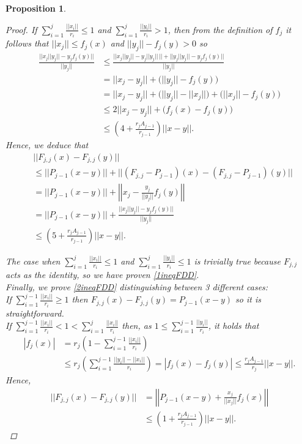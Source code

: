\documentclass[11pt]{amsart}
\newcommand{\<}{\langle}
\renewcommand{\>}{\rangle}
\newtheorem{prop}[theorem]{Proposition}
\theoremstyle{definition}
\theoremstyle{remark}
\numberwithin{equation}{section}
\begin{document}
\begin{prop}
\begin{proof}
If $\sum\limits_{i=1}^{j}\frac{||x_i||}{r_i}\le1$ and $\sum\limits_{i=1}^{j}\frac{||y_i||}{r_i}>1$, then from the definition of $f_j$ it follows that $||x_j||\le f_j(x)$ and $||y_j||-f_j(y)>0$ so
$$\begin{aligned}\frac{\big|\big|x_j||y_j||-y_jf_j(y)\big|\big|}{||y_j||}&\le\frac{\big|\big|x_j||y_j||-y_j||y_j||\,\big|\big|+\big|\big|y_j||y_j||-y_jf_j(y)\big|\big|}{||y_j||}\\
&=||x_j-y_j||+\big(||y_j||-f_j(y)\big)\\
&=||x_j-y_j||+\big(||y_j||-||x_j||\big)+\big(||x_j||-f_j(y)\big)\\
&\le2||x_j-y_j||+\big(f_j(x)-f_j(y)\big)\\
&\le\left(4+\frac{r_jA_{j-1}}{r_{j-1}}\right)||x-y||.
\end{aligned}$$
Hence, we deduce that
$$\begin{aligned} &||F_{j,j}(x)-F_{j,j}(y)||\\
&\le ||P_{j-1}(x-y)||+||(F_{j,j}-P_{j-1})(x)-(F_{j,j}-P_{j-1})(y)||\\
&=||P_{j-1}(x-y)||+\left|\left| x_j-\frac{y_j}{||y_j||}f_j(y) \right|\right|\\
&=||P_{j-1}(x-y)||+\frac{\big|\big|x_j||y_j||-y_jf_j(y) \big|\big|}{||y_j||}\\
&\le \left(5+\frac{r_jA_{j-1}}{r_{j-1}}\right)||x-y||. \end{aligned}$$

The case when  $\sum\limits_{i=1}^{j}\frac{||x_i||}{r_i}\le1$ and $\sum\limits_{i=1}^{j}\frac{||y_i||}{r_i}\le1$ is trivially true because $F_{j,j}$ acts as the identity, so we have proven \eqref{1ineqFDD}.\\

Finally, we prove \eqref{2ineqFDD} distinguishing between 3 different cases:\\

If $\sum\limits_{i=1}^{j-1}\frac{||x_i||}{r_i}\ge1$ then $F_{j,j}(x)-F_{j,j}(y)=P_{j-1}(x-y)$ so it is straightforward.\\

If $\sum\limits_{i=1}^{j-1}\frac{||x_i||}{r_i}<1<\sum\limits_{i=1}^{j}\frac{||x_i||}{r_i}$ then, as $1\le\sum\limits_{i=1}^{j-1}\frac{||y_i||}{r_i}$, it holds that
$$\begin{aligned}|f_j(x)|&=r_j\left(1-\sum\limits_{i=1}^{j-1}\frac{||x_i||}{r_i}\right)\\
&\le r_j\left(\sum\limits_{i=1}^{j-1}\frac{||y_i||-||x_i||}{r_i}\right)=|f_j(x)-f_j(y)|\le \frac{r_jA_{j-1}}{r_j}||x-y||.\end{aligned}$$
Hence,
$$\begin{aligned}||F_{j,j}(x)-F_{j,j}(y)||&=\left|\left| P_{j-1}(x-y)+\frac{x_j}{||x_j||}f_j(x) \right|\right|\\
&\le \left(1+\frac{r_jA_{j-1}}{r_{j-1}}\right)||x-y||.\end{aligned}$$


\end{proof}
\end{prop}
\end{document}
